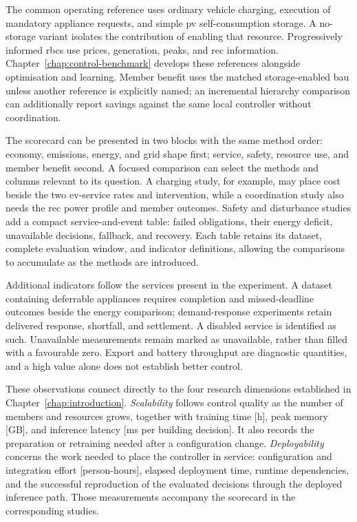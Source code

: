 The common operating reference uses ordinary vehicle charging, execution of mandatory appliance requests, and simple \gls{pv} self-consumption storage. A no-storage variant isolates the contribution of enabling that resource. Progressively informed \glspl{rbc} use prices, generation, peaks, and \gls{rec} information. Chapter~\ref{chap:control-benchmark} develops these references alongside optimisation and learning. Member benefit uses the matched storage-enabled \gls{bau} unless another reference is explicitly named; an incremental hierarchy comparison can additionally report savings against the same local controller without coordination.

The scorecard can be presented in two blocks with the same method order: economy, emissions, energy, and grid shape first; service, safety, resource use, and member benefit second. A focused comparison can select the methods and columns relevant to its question. A charging study, for example, may place cost beside the two \gls{ev}-service rates and intervention, while a coordination study also needs the \gls{rec} power profile and member outcomes. Safety and disturbance studies add a compact service-and-event table: failed obligations, their energy deficit, unavailable decisions, fallback, and recovery. Each table retains its dataset, complete evaluation window, and indicator definitions, allowing the comparisons to accumulate as the methods are introduced.

Additional indicators follow the services present in the experiment. A dataset containing deferrable appliances requires completion and missed-deadline outcomes beside the energy comparison; demand-response experiments retain delivered response, shortfall, and settlement. A disabled service is identified as such. Unavailable measurements remain marked as unavailable, rather than filled with a favourable zero. Export and battery throughput are diagnostic quantities, and a high value alone does not establish better control.

These observations connect directly to the four research dimensions established in Chapter~\ref{chap:introduction}. \emph{Scalability} follows control quality as the number of members and resources grows, together with training time [h], peak memory [GB], and inference latency [ms per building decision]. It also records the preparation or retraining needed after a configuration change. \emph{Deployability} concerns the work needed to place the controller in service: configuration and integration effort [person-hours], elapsed deployment time, runtime dependencies, and the successful reproduction of the evaluated decisions through the deployed inference path. Those measurements accompany the scorecard in the corresponding studies.

